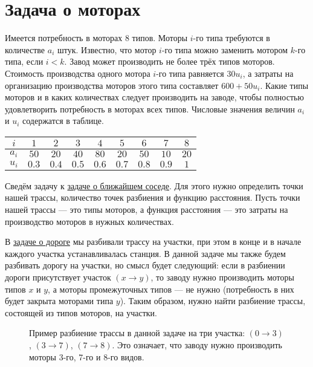 \section{Задача о моторах}

\problem[о моторах]

Имеется потребность в моторах 8 типов. Моторы $i$-го типа требуются в количестве $a_i$ штук. Известно, что мотор $i$-го типа можно заменить мотором $k$-го типа, если $i < k$. Завод может производить не более трёх типов моторов. Стоимость производства одного мотора $i$-го типа равняется $30 u_i$, а затраты на организацию производства моторов этого типа составляет $600 + 50 u_i$. Какие типы моторов и в каких количествах следует производить на заводе, чтобы полностью удовлетворить потребность в моторах всех типов. Числовые значения величин $a_i$ и $u_i$ содержатся в таблице.

\begin{table}[H]
	\centering
	\begin{tabular}{ | c | c | c | c | c | c | c | c | c | } 
		\hline
		$i$ & $1$ & $2$ & $3$ & $4$ & $5$ & $6$ & $7$ & $8$\\\hline
		$a_i$ & $50$ & $20$ & $40$ & $80$ & $20$ & $50$ & $10$ & $20$\\\hline
		$u_i$ & $0.3$ & $0.4$ & $0.5$ & $0.6$ & $0.7$ & $0.8$ & $0.9$ & $1$\\\hline
	\end{tabular}
\end{table}

\mathmodel

Сведём задачу к \hyperref[pr:nearest_neighbor_problem]{задаче о ближайшем соседе}. Для этого нужно определить точки нашей трассы, количество точек разбиения и функцию расстояния. Пусть точки нашей трассы --- это типы моторов, а функция расстояния --- это затраты на производство моторов в нужных количествах.

В \hyperref[pr:road]{задаче о дороге} мы разбивали трассу на участки, при этом в конце и в начале каждого участка устанавливалась станция. В данной задаче мы также будем разбивать дорогу на участки, но смысл будет следующий: если в разбиении дороги присутствует участок $(x \to y)$, то заводу нужно производить моторы типов $x$ и $y$, а моторы промежуточных типов --- не нужно (потребность в них будет закрыта моторами типа $y$). Таким образом, нужно найти разбиение трассы, состоящей из типов моторов, на участки.

\begin{figure}[H]
	\centering
	\caption{Пример разбиение трассы в данной задаче на три участка: $(0 \to 3)$, $(3 \to 7)$, $(7 \to 8)$. Это означает, что заводу нужно производить моторы 3-го, 7-го и 8-го видов.}
\end{figure}

